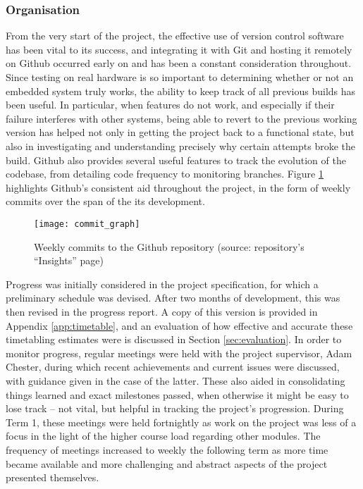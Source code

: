     \subsubsection{Organisation}
        From the very start of the project, the effective use of version control
        software has been vital to its success, and integrating it with Git and
        hosting it remotely on Github occurred early on and has been a constant
        consideration throughout. Since testing on real hardware is so important
        to determining whether or not an embedded system truly works, the
        ability to keep track of all previous builds has been useful.  In
        particular, when features do not work, and especially if their failure
        interferes with other systems, being able to revert to the previous
        working version has helped not only in getting the project back to a
        functional state, but also in investigating and understanding precisely
        why certain attempts broke the build. Github also provides several
        useful features to track the evolution of the codebase, from detailing
        code frequency to monitoring branches. Figure \ref{fig:commits}
        highlights Github's consistent aid throughout the project, in the form of weekly
        commits over the span of the its development.

        \begin{figure}[h]
            \centering
            \texttt{[image: commit\_graph]}
            \caption{Weekly commits to the Github repository (source:
            repository's ``Insights'' page)}
            \label{fig:commits}
        \end{figure}

        Progress was initially considered in the project specification, for
        which a preliminary schedule was devised. After two months of
        development, this was then revised in the progress report.  A copy of
        this version is provided in Appendix \ref{app:timetable}, and an
        evaluation of how effective and accurate these timetabling estimates
        were is discussed in Section \ref{sec:evaluation}. In order to monitor
        progress, regular meetings were held with the project supervisor, Adam
        Chester, during which recent achievements and current issues were
        discussed, with guidance given in the case of the latter. These also
        aided in consolidating things learned and exact milestones passed, when
        otherwise it might be easy to lose track -- not vital, but helpful in
        tracking the project's progression. During Term 1, these meetings were
        held fortnightly as work on the project was less of a focus in the light
        of the higher course load regarding other modules. The frequency of
        meetings increased to weekly the following term as more time became
        available and more challenging and abstract aspects of the project
        presented themselves.

